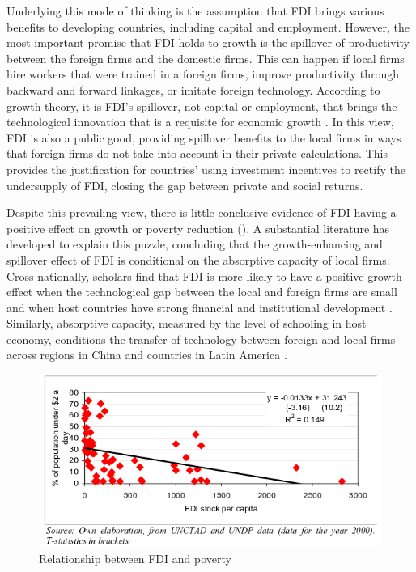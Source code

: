 \documentclass[12pt]{article}
\begin{document}
Underlying this mode of thinking is the assumption that FDI brings various benefits to developing countries, including capital and employment. However, the most important promise that FDI holds to growth is the spillover of productivity between the foreign firms and the domestic firms. This can happen if local firms hire workers that were trained in a foreign firms, improve productivity through backward and forward linkages, or imitate foreign technology. According to growth theory, it is FDI's spillover, not capital or employment, that brings the technological innovation that is a requisite for economic growth \citep{Findlay1978}. In this view, FDI is also a public good, providing spillover benefits to the local firms in ways that foreign firms do not take into account in their private calculations. This provides the justification for countries' using investment incentives to rectify the undersupply of FDI, closing the gap between private and social returns. 

Despite this prevailing view, there is little conclusive evidence of FDI having a positive effect on growth \citep{Nair-Reichert2001, Carkovic2002} or poverty reduction \citep{Guerra2009} (). A substantial literature has developed to explain this puzzle, concluding that the growth-enhancing and spillover effect of FDI is conditional on the absorptive capacity of local firms. Cross-nationally, scholars find that FDI is more likely to have a positive growth effect when the technological gap between the local and foreign firms are small \citep{Nunnenkamp2004} and when host countries have strong financial and institutional development \citep{ Durham2004}. Similarly, absorptive capacity, measured by the level of schooling in host economy, conditions the transfer of technology between foreign and local firms across regions in China \citep{Fu2008} and countries in Latin America \citep{Willem2004}.

\begin{figure}[!ht]
\includegraphics[width=\textwidth, height=\textheight,keepaspectratio]{../figure/fdi_poverty}
\caption{Relationship between FDI and poverty}
\label{fig:fdipoverty}
\end{figure}
\end{document}
